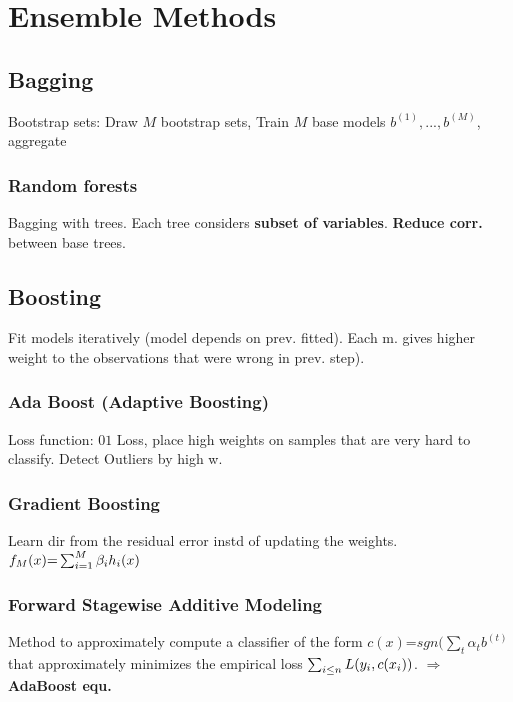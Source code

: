 \section{Ensemble Methods}
\subsection{Bagging}
 Bootstrap sets: Draw $M$ bootstrap sets, Train $M$ base models $b^{(1)}, ... , b^{(M)}$, aggregate
 
\subsubsection{Random forests}
Bagging with trees. Each tree considers \textbf{subset of variables}. \textbf{Reduce corr.} between base trees.

\subsection{Boosting }
Fit models iteratively (model depends on prev. fitted). Each m. gives higher weight to the observations that were wrong in prev. step).


\subsubsection{Ada Boost (Adaptive Boosting)}
 Loss function: $0$\text{-}$1$ Loss,  place high weights on samples that are very hard to classify. Detect Outliers by high w.
 
\subsubsection{Gradient Boosting}
Learn dir from the residual error instd of updating the weights. 
$	
	f_M(x) \text{=} \sum_{i = 1}^{M} \beta_i h_i(x)
$

\subsubsection{Forward Stagewise Additive Modeling}
Method to approximately compute a classifier of the form $c(x) \text{=} \mathit{sgn}(\sum_t\alpha_t b^{(t)}$ that approximately minimizes the empirical loss $\sum_{i\leq n} L(y_i, c(x_i))$.
$\Rightarrow$ \textbf{AdaBoost  equ.}
